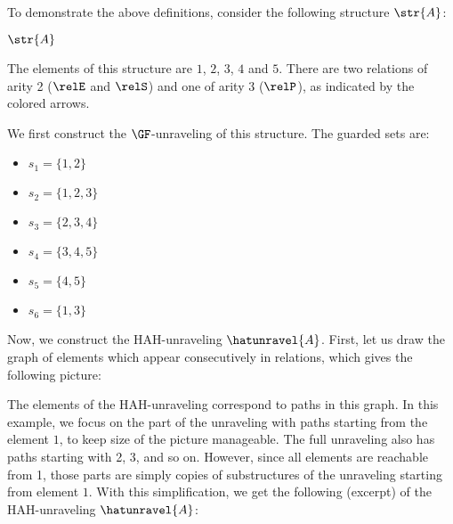 \begin{example}
  To demonstrate the above definitions, consider the following structure $\str{A}$:
  \begin{center}
    \Huge{$\str{A}$}
  \end{center}
  The elements of this structure are $1$, $2$, $3$, $4$ and $5$.
  There are two relations of arity 2 (\textcolor{tolhighcontrastYellow}{$\relE$} and \textcolor{tolhighcontrastRed}{$\relS$}) and one of arity 3 (\textcolor{tolhighcontrastBlue}{$\relP$}), as indicated by the colored arrows.

  We first construct the $\GF$-unraveling of this structure. The guarded sets are:
  \begin{multicols}{3}
  \begin{itemize}
    \item $s_{1} = \{1,2\}$
    \item $s_{2} = \{1,2,3\}$
    \item $s_{3} = \{2,3,4\}$
    \item $s_{4} = \{3,4,5\}$
    \item $s_{5} = \{4,5\}$
    \item $s_{6} = \{1,3\}$
  \end{itemize}
  \end{multicols}


  Now, we construct the HAH-unraveling $\hatunravel{A}$. First, let us draw the graph of elements which appear consecutively in relations, which gives the following picture:
  \begin{center}
  
  \end{center}

  The elements of the HAH-unraveling correspond to paths in this graph.
  In this example, we focus on the part of the unraveling with paths starting from the element $1$, to keep size of the picture manageable.
  The full unraveling also has paths starting with 2, 3, and so on.
  However, since all elements are reachable from 1, those parts are simply copies of substructures of the unraveling starting from element $1$.
  With this simplification, we get the following (excerpt) of the HAH-unraveling $\hatunravel{A}$:
  \begin{center}
  
  \end{center}
\end{example}

